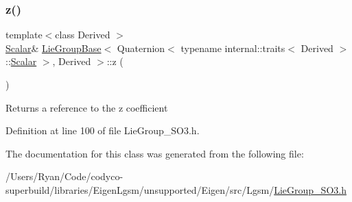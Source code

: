 \subsubsection{\texorpdfstring{z()}{z()}\hspace{0.1cm}{\footnotesize\ttfamily [2/2]}}
{\footnotesize\ttfamily template$<$class Derived $>$ \\
\hyperlink{class_lie_group_base_3_01_quaternion_3_01typename_01internal_1_1traits_3_01_derived_01_4_1_1_scalar_01_4_00_01_derived_01_4_afadeceb3b98e52deecc572e71efb82a8}{Scalar}\& \hyperlink{class_lie_group_base}{Lie\+Group\+Base}$<$ Quaternion$<$ typename internal\+::traits$<$ Derived $>$\+::\hyperlink{class_lie_group_base_3_01_quaternion_3_01typename_01internal_1_1traits_3_01_derived_01_4_1_1_scalar_01_4_00_01_derived_01_4_afadeceb3b98e52deecc572e71efb82a8}{Scalar} $>$, Derived $>$\+::z (\begin{DoxyParamCaption}{ }\end{DoxyParamCaption})\hspace{0.3cm}{\ttfamily [inline]}}

\begin{DoxyReturn}{Returns}
a reference to the {\ttfamily z} coefficient 
\end{DoxyReturn}


Definition at line 100 of file Lie\+Group\+\_\+\+S\+O3.\+h.



The documentation for this class was generated from the following file\+:\begin{DoxyCompactItemize}
\item 
/\+Users/\+Ryan/\+Code/codyco-\/superbuild/libraries/\+Eigen\+Lgsm/unsupported/\+Eigen/src/\+Lgsm/\hyperlink{_lie_group___s_o3_8h}{Lie\+Group\+\_\+\+S\+O3.\+h}\end{DoxyCompactItemize}
